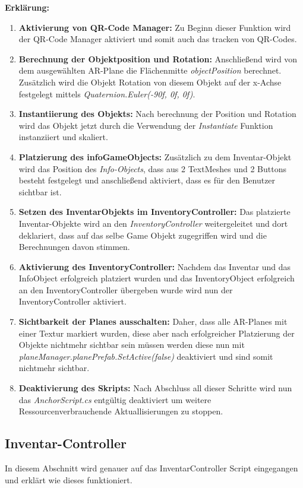 \textbf{Erklärung:}
\begin{enumerate}
    \item \textbf{Aktivierung von QR-Code Manager:} Zu Beginn dieser Funktion wird der QR-Code Manager aktiviert und
    somit auch das tracken von QR-Codes.
    \item \textbf{Berechnung der Objektposition und Rotation:} Anschließend wird von dem ausgewählten AR-Plane die
    Flächenmitte \textit{objectPosition} berechnet. Zusätzlich wird die Objekt Rotation von diesem Objekt auf der x-Achse
    festgelegt mittels \textit{Quaternion.Euler(-90f, 0f, 0f)}.
    \item \textbf{Instantiierung des Objekts:} Nach berechnung der Position und Rotation wird das Objekt jetzt durch
    die Verwendung der \textit{Instantiate} Funktion instanziiert und skaliert.
    \item \textbf{Platzierung des infoGameObjects:} Zusätzlich zu dem Inventar-Objekt wird das Position des \textit{Info-Objects},
    dass aus 2 TextMeshes und 2 Buttons besteht festgelegt und anschließend aktiviert, dass es für den Benutzer sichtbar ist.
    \item \textbf{Setzen des InventarObjekts im InventoryController:} Das platzierte Inventar-Objekte wird an den \textit{InventoryController}
    weitergeleitet und dort deklariert, dass auf das selbe Game Objekt zugegriffen wird und die Berechnungen davon stimmen.
    \item \textbf{Aktivierung des InventoryController:} Nachdem das Inventar und das InfoObject erfolgreich platziert wurden
    und das InventoryObject erfolgreich an den InventoryController übergeben wurde wird nun der InventoryController
    aktiviert.
    \item \textbf{Sichtbarkeit der Planes ausschalten:} Daher, dass alle AR-Planes mit einer Textur markiert wurden, diese
    aber nach erfolgreicher Platzierung der Objekte nichtmehr sichtbar sein müssen werden diese nun mit \textit{planeManager.planePrefab.SetActive(false)}
    deaktiviert und sind somit nichtmehr sichtbar.
    \item \textbf{Deaktivierung des Skripts:} Nach Abschluss all dieser Schritte wird nun das \textit{AnchorScript.cs}
    entgültig deaktiviert um weitere Ressourcenverbrauchende Aktuallisierungen zu stoppen.
\end{enumerate}

\subsection{Inventar-Controller}
In diesem Abschnitt wird genauer auf das InventarController Script eingegangen und erklärt wie dieses funktioniert.

